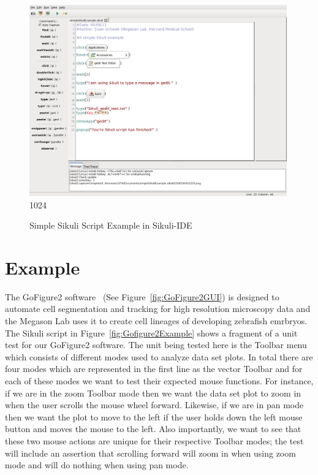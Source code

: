 \documentclass{InsightArticle}
\begin{document}
\begin{figure}[tbp]
 \centering
 \includegraphics[width=0.99\textwidth]{Images/SimpleSikuliExample.png}
1024
 \caption{Simple Sikuli Script Example in Sikuli-IDE}
 \label{fig:SimpleExample}
\end{figure}

\section{Example}
\label{sec:GoFigure2Example}

The GoFigure2 software~\cite{GoFigure2:Website} (See
Figure~\ref{fig:GoFigure2GUI}) is designed to automate
cell segmentation and tracking for high resolution microscopy data and the
Megason Lab uses it to create cell lineages of developing zebrafish emrbryos.
The Sikuli script in Figure~\ref{fig:Gofigure2Example} shows a fragment of a
unit test for our GoFigure2 software. The unit being tested here is the Toolbar
menu which consists of different modes used to analyze data set plots. In total
there are four modes which are represented in the first line as the vector
Toolbar and for each of these modes we want to test their expected
mouse functions. For instance, if we are in the zoom Toolbar mode then we want
the data set plot to zoom in when the user scrolls the mouse wheel
forward. Likewise, if we are in pan mode then we want the plot to move to the
left if the user holds down the left mouse button and moves the mouse to
the left. Also importantly, we want to see that these two mouse actions are
unique for their respective Toolbar modes; the test will include an assertion
that scrolling forward will zoom in when using zoom mode and will do nothing
when using pan mode.\\
\end{document}

